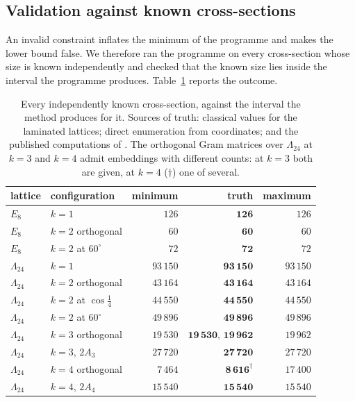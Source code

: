 \documentclass[11pt]{amsart}
\theoremstyle{remark}
\newcommand{\Leech}{\Lambda_{24}}
\begin{document}
\subsection{Validation against known cross-sections}\label{ss:validate}

An invalid constraint inflates the minimum of the programme and makes the lower
bound false. We therefore ran the programme on every cross-section whose size is
known independently and checked that the known size lies inside the interval the
programme produces. Table~\ref{tab:validate} reports the outcome.

\begin{table}[ht]
\caption{Every independently known cross-section, against the interval the
method produces for it. Sources of truth: classical values for the laminated
lattices; direct enumeration from coordinates; and the published computations
of \cite{boyvalenkov-cherkashin2025,ozeki2016,sun-wang2026}. The orthogonal Gram matrices over $\Leech$ at $k=3$ and
$k=4$ admit embeddings with different counts: at $k=3$ both are given, at $k=4$
($\dagger$) one of several.}
\label{tab:validate}
\begin{tabular}{llrrr}
\toprule
lattice & configuration & minimum & \textbf{truth} & maximum \\
\midrule
$E_8$    & $k=1$                   & $126$ & $\mathbf{126}$ & $126$ \\
$E_8$    & $k=2$ orthogonal        & $60$ & $\mathbf{60}$ & $60$ \\
$E_8$    & $k=2$ at $60^\circ$     & $72$ & $\mathbf{72}$ & $72$ \\
$\Leech$ & $k=1$                   & $93\,150$ & $\mathbf{93\,150}$ & $93\,150$ \\
$\Leech$ & $k=2$ orthogonal        & $43\,164$ & $\mathbf{43\,164}$ & $43\,164$ \\
$\Leech$ & $k=2$ at $\cos\tfrac14$ & $44\,550$ & $\mathbf{44\,550}$ & $44\,550$ \\
$\Leech$ & $k=2$ at $60^\circ$     & $49\,896$ & $\mathbf{49\,896}$ & $49\,896$ \\
$\Leech$ & $k=3$ orthogonal        & $19\,530$ & $\mathbf{19\,530},\,\mathbf{19\,962}$ & $19\,962$ \\
$\Leech$ & $k=3$, $2A_3$           & $27\,720$ & $\mathbf{27\,720}$ & $27\,720$ \\
$\Leech$ & $k=4$ orthogonal        & $7\,464$ & $\mathbf{8\,616}^{\dagger}$ & $17\,400$ \\
$\Leech$ & $k=4$, $2A_4$           & $15\,540$ & $\mathbf{15\,540}$ & $15\,540$ \\

\end{tabular}
\end{table}
\end{document}
